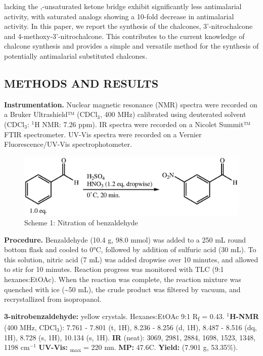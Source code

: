 \documentclass[11pt]{article}
\let\bf\textbf
\begin{document}
lacking the \textalpha,\textbeta-unsaturated ketone bridge exhibit significantly less antimalarial activity, with saturated analogs showing a 10-fold decrease in antimalarial activity.\cite{Li1995} In this paper, we report the synthesis of the chalcones, 3'-nitrochalcone and 4-methoxy-3'-nitrochalcone. This contributes to the current knowledge of chalcone synthesis and provides a simple and versatile method for the synthesis of potentially antimalarial substituted chalcones.
\subsection*{METHODS AND RESULTS}
\bf{Instrumentation.} Nuclear magnetic resonance (NMR) spectra were recorded on a Bruker Ultrashield™ (CDCl$_3$, 400 MHz) calibrated using deuterated solvent (CDCl$_3$: $^1$H NMR: 7.26 ppm). IR spectra were recorded on a Nicolet Summit™ FTIR spectrometer. UV-Vis spectra were recorded on a Vernier Fluorescence/UV-Vis spectrophotometer.

\begin{figure}[H]
    \centering
    \includegraphics[scale=0.8]{schemes/nitration.eps}
    \captionsetup{labelformat=empty}
    \caption{Scheme 1: Nitration of benzaldehyde}
\end{figure}
\bf{Procedure.} Benzaldehyde (10.4 g, 98.0 mmol) was added to a 250 mL round bottom flask and cooled to 0°C, followed by addition of sulfuric acid (30 mL). To this solution, nitric acid (7 mL) was added dropwise over 10 minutes, and allowed to stir for 10 minutes. Reaction progress was monitored with TLC (9:1 hexanes:EtOAc). When the reaction was complete, the reaction mixture was quenched with ice (\textasciitilde 50 mL), the crude product was filtered by vacuum, and recrystallized from isopropanol.

\noindent\bf{3-nitrobenzaldehyde:} yellow crystals. Hexanes:EtOAc 9:1 R\textsubscript{f} = 0.43. \bf{$^1$H-NMR} (400 MHz, CDCl$_3$): \textdelta\hspace{0mm} 7.761 - 7.801 (t, 1H), 8.236 - 8.256 (d, 1H), 8.487 - 8.516 (dq, 1H), 8.728 (s, 1H), 10.134 (s, 1H). \bf{IR} (neat): 3069, 2981, 2884, 1698, 1523, 1348, 1198 cm$^{-1}$ \bf{UV-Vis:} \textlambda\textsubscript{max} = 220 nm. \bf{MP:} 47.6\degree C. \bf{Yield:} (7.901 g, 53.35\%).
\end{document}
